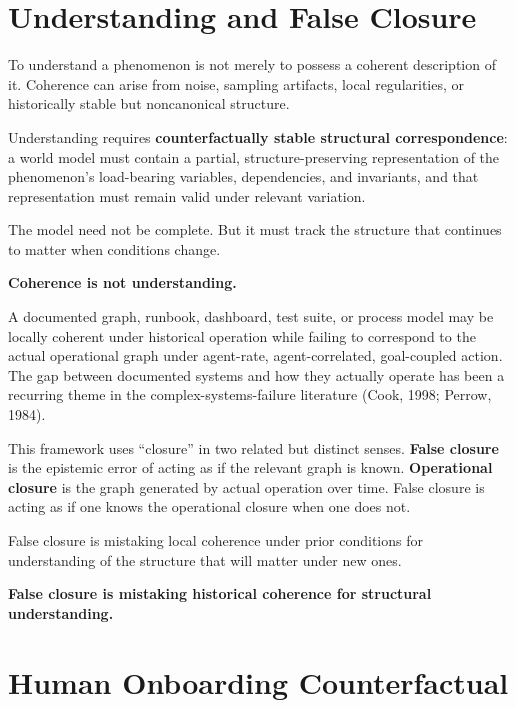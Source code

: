 \documentclass[11pt]{article}
\begin{document}
\section{Understanding and False Closure}

To understand a phenomenon is not merely to possess a coherent description of it. Coherence can arise from noise, sampling artifacts, local regularities, or historically stable but noncanonical structure.

Understanding requires \textbf{counterfactually stable structural correspondence}: a world model must contain a partial, structure-preserving representation of the phenomenon's load-bearing variables, dependencies, and invariants, and that representation must remain valid under relevant variation.

The model need not be complete. But it must track the structure that continues to matter when conditions change.

\begin{pullquote}
\textbf{Coherence is not understanding.}
\end{pullquote}

A documented graph, runbook, dashboard, test suite, or process model may be locally coherent under historical operation while failing to correspond to the actual operational graph under agent-rate, agent-correlated, goal-coupled action. The gap between documented systems and how they actually operate has been a recurring theme in the complex-systems-failure literature (Cook, 1998; Perrow, 1984).

This framework uses ``closure'' in two related but distinct senses. \textbf{False closure} is the epistemic error of acting as if the relevant graph is known. \textbf{Operational closure} is the graph generated by actual operation over time. False closure is acting as if one knows the operational closure when one does not.

False closure is mistaking local coherence under prior conditions for understanding of the structure that will matter under new ones.

\begin{pullquote}
\textbf{False closure is mistaking historical coherence for structural understanding.}
\end{pullquote}

\section{Human Onboarding Counterfactual}
\end{document}
